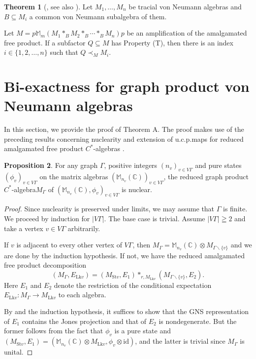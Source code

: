 \documentclass{amsart}
\theoremstyle{definition}
\newtheorem{theorem}{Theorem}[section]
\newtheorem{proposition}[theorem]{Proposition}
\renewcommand{\subset}{\subseteq}
\newcommand{\Mat}{\mathbb{M}}
\newcommand{\Cstaralg}{$C^{\ast}$-algebra\xspace}
\newcommand{\Cstaralgs}{$C^{\ast}$-algebras\xspace}
\begin{document}
\begin{theorem}[\textup{\cite[Theorem 4.3]{ipp}}, see also \textup{\cite[Theorem 5.6]{hou}}]
Let $M_1, \ldots, M_n$ be tracial von Neumann algebras and $B\subset M_i$ 
a common von Neumann subalgebra of them. 

Let $M=p\Mat_m(M_1\ast_B M_2 \ast_B\cdots \ast_B M_n)p$ be 
an amplification of the amalgamated free product. 
If a subfactor $Q\subset M$ has Property (T), 
then there is an index $i\in \{ 1,2,\ldots, n\}$ such that $Q\prec_M M_i$. 
\end{theorem}









\section{Bi-exactness for graph product von Neumann algebras}

In this section, we provide the proof of Theorem A. 
The proof makes use of the preceding results concerning 
nuclearity and extension of u.c.p.\@ maps for 
reduced amalgamated free product \Cstaralgs
\cite{oza2, has}. 


\begin{proposition}
For any graph $\Gamma$, positive integers $(n_v)_{v\in V\Gamma}$ and pure states $(\phi_v)_{v\in V\Gamma}$ on the matrix algebras $(\Mat_{n_v}(\mathbb{C}))_{v\in V\Gamma}$, the reduced graph product \Cstaralg $M_\Gamma$ of $(\Mat_{n_v}(\mathbb{C}), \phi_v)_{v\in V\Gamma}$ is nuclear. 

\end{proposition}

\begin{proof}
Since nuclearity is preserved under limits, we may assume that $\Gamma$ is finite. We proceed by induction for $|V\Gamma|$. 
The base case is trivial. Assume $|V\Gamma|\geqq 2$ and take a vertex $v\in V\Gamma$ arbitrarily. 

If $v$ is adjacent to every other vertex of $V\Gamma$, 
then $M_{\Gamma}=\Mat_{n_v}(\mathbb{C})\otimes M_{\Gamma\backslash \{v \}}$ 
and we are done by the induction hypothesis. 
If not, we have the reduced amalgamated free product decomposition 
\[
(M_{\Gamma}, E_{\mathrm{Lk}v})=(M_{\mathrm{St}v}, E_1) \ast_{r, M_{\mathrm{Lk}v}} (M_{\Gamma\backslash \{v \}}, E_2). 
\] 
Here $E_1$ and $E_2$ denote the restriction of the conditional expectation 
$E_{\mathrm{Lk}v} : M_{\Gamma} \to M_{\mathrm{Lk}v}$ to each algebra. 

By \cite[Theorem 5.2]{has} and the induction hypothesis, 
it suffices to show that the GNS representation of $E_1$ contains the Jones projection and that of $E_2$ is nondegenerate. 
But the former follows from the fact that $\phi_v$ is a pure state and $(M_{\mathrm{St}v}, E_1) = (\Mat_{n_v}(\mathbb{C})\otimes M_{\mathrm{Lk}v}, \phi_v\otimes \mathrm{id})$, and the latter is trivial since $M_{\Gamma}$ is unital. 
\end{proof}
\end{document}
